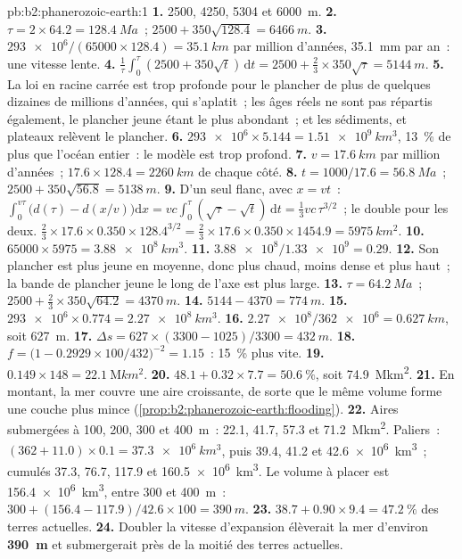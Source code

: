 \begin{solution}{pb:b2:phanerozoic-earth:1}
\textbf{1.} 2500, 4250, 5304 et \qty{6000}{m}.
\textbf{2.} $\tau = 2 \times 64.2 = \qty{128.4}{Ma}$~; $2500 + 350\sqrt{128.4} = \qty{6466}{m}$.
\textbf{3.} $\num{293e6}/(65000 \times 128.4) = \qty{35.1}{km}$ par million d'années,
\qty{35.1}{mm} par an~: une vitesse lente.
\textbf{4.} $\frac1\tau\int_0^\tau(2500 + 350\sqrt t)\,\mathrm{d}t = 2500 + \frac23 \times
350\sqrt\tau = \qty{5144}{m}$.
\textbf{5.} La loi en racine carrée est trop profonde pour le plancher de plus de quelques dizaines de millions d'années,
qui s'aplatit~; les âges réels ne sont pas répartis également, le plancher jeune étant le plus abondant~; et
les sédiments,  et plateaux relèvent le plancher.
\textbf{6.} $\num{293e6} \times 5.144 = \qty{1.51e9}{km^3}$, \qty{13}{\percent} de plus que
l'océan entier~: le modèle est trop profond.
\textbf{7.} $v = \qty{17.6}{km}$ par million d'années~; $17.6 \times 128.4 = \qty{2260}{km}$ de
chaque côté.
\textbf{8.} $t = 1000/17.6 = \qty{56.8}{Ma}$~; $2500 + 350\sqrt{56.8} = \qty{5138}{m}$.
\textbf{9.} D'un seul flanc, avec $x = vt$~: $\int_0^{v\tau}\bigl(d(\tau) - d(x/v)\bigr)\mathrm{d}x
= vc\int_0^\tau(\sqrt\tau - \sqrt t)\,\mathrm{d}t = \frac13 vc\,\tau^{3/2}$~; le double pour les deux.
$\frac23 \times 17.6 \times 0.350 \times 128.4^{3/2} = \frac23 \times 17.6 \times 0.350 \times
1454.9 = \qty{5975}{km^2}$.
\textbf{10.} $65000 \times 5975 = \qty{3.88e8}{km^3}$.
\textbf{11.} $\num{3.88e8}/\num{1.33e9} = 0.29$.
\textbf{12.} Son plancher est plus jeune en moyenne, donc plus chaud, moins dense et plus haut~; la bande de
plancher jeune le long de l'axe est plus large.
\textbf{13.} $\tau = \qty{64.2}{Ma}$~; $2500 + \frac23 \times 350\sqrt{64.2} = \qty{4370}{m}$.
\textbf{14.} $5144 - 4370 = \qty{774}{m}$.
\textbf{15.} $\num{293e6} \times 0.774 = \qty{2.27e8}{km^3}$.
\textbf{16.} $\num{2.27e8}/\num{362e6} = \qty{0.627}{km}$, soit \qty{627}{m}.
\textbf{17.} $\Delta s = 627 \times (3300 - 1025)/3300 = \qty{432}{m}$.
\textbf{18.} $f = \bigl(1 - 0.2929 \times 100/432\bigr)^{-2} = 1.15$~: \qty{15}{\percent} plus vite.
\textbf{19.} $0.149 \times 148 = \qty{22.1}{\mega km^2}$.
\textbf{20.} $48.1 + 0.32 \times 7.7 = \qty{50.6}{\percent}$, soit \qty{74.9}{\mega km^2}.
\textbf{21.} En montant, la mer couvre une aire croissante, de sorte que le même volume forme une couche plus mince
(\cref{prop:b2:phanerozoic-earth:flooding}).
\textbf{22.} Aires submergées à 100, 200, 300 et \qty{400}{m}~: 22.1, 41.7, 57.3 et
\qty{71.2}{\mega km^2}. Paliers~: $(362 + 11.0) \times 0.1 = \qty{37.3e6}{km^3}$, puis 39.4, 41.2
et \qty{42.6e6}{km^3}~; cumulés 37.3, 76.7, 117.9 et \qty{160.5e6}{km^3}. Le volume à placer
est \qty{156.4e6}{km^3}, entre 300 et \qty{400}{m}~: $300 + (156.4 - 117.9)/42.6 \times 100
= \qty{390}{m}$.
\textbf{23.} $38.7 + 0.90 \times 9.4 = \qty{47.2}{\percent}$ des terres actuelles.
\textbf{24.} Doubler la vitesse d'expansion élèverait la mer d'environ \textbf{\qty{390}{m}} et submergerait près de la moitié
des terres actuelles.
\end{solution}
